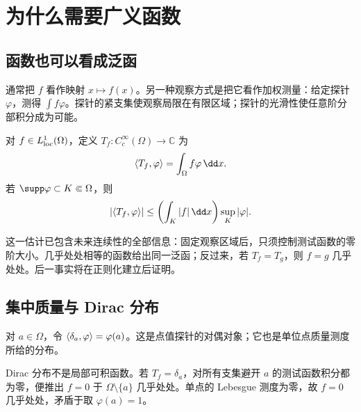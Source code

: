 \chapter{为什么需要广义函数}\label{ch:motivation}

\section{函数也可以看成泛函}
通常把 $f$ 看作映射 $x\mapsto f(x)$。另一种观察方式是把它看作加权测量：给定探针 $\varphi$，测得 $\int f\varphi$。探针的紧支集使观察局限在有限区域；探针的光滑性使任意阶分部积分成为可能。
\begin{definition}[正则分布的原型]
对 $f\in L^1_{\mathrm{loc}}(\Omega)$，定义 $T_f:C_c^\infty(\Omega)\to\mathbb C$ 为
\[
 \Pair{T_f}{\varphi}=\int_\Omega f\varphi\,\dd x.
\]
若 $\supp\varphi\subset K\Subset\Omega$，则
\begin{equation}\label{eq:regular-bound}
 |\Pair{T_f}{\varphi}|\le \left(\int_K|f|\,\dd x\right)\sup_K|\varphi|.
\end{equation}
\end{definition}
这一估计已包含未来连续性的全部信息：固定观察区域后，只须控制测试函数的零阶大小。几乎处处相等的函数给出同一泛函；反过来，若 $T_f=T_g$，则 $f=g$ 几乎处处。后一事实将在正则化建立后证明。

\section{集中质量与 Dirac 分布}
\begin{definition}[Dirac 分布]
对 $a\in\Omega$，令 $\langle \delta_a,\varphi\rangle=\varphi(a)$。这是点值探针的对偶对象；它也是单位点质量测度所给的分布。
\end{definition}
Dirac 分布不是局部可积函数。若 $T_f=\delta_a$，对所有支集避开 $a$ 的测试函数积分都为零，便推出 $f=0$ 于 $\Omega\setminus\{a\}$ 几乎处处。单点的 Lebesgue 测度为零，故 $f=0$ 几乎处处，矛盾于取 $\varphi(a)=1$。


